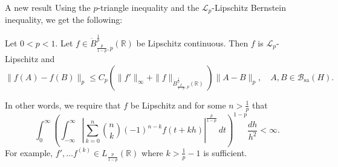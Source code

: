 \documentclass{beamer}
\numberwithin{equation}{section}
\theoremstyle{plain}
\theoremstyle{plain}
\theoremstyle{definition}
\theoremstyle{plain}
\theoremstyle{plain}
\theoremstyle{definition}
\newcommand{\Rl}{\mathbb{R}}
\newcommand{\Itgr}{\mathbb{Z}}
\newcommand{\Bc}{\mathcal{B}}
\newcommand{\Lc}{\mathcal{L}}
\newcommand{\sa}{\mathrm{sa}}
\begin{document}
\begin{frame}{A new result}
    Using the $p$-triangle inequality and the $\Lc_p$-Lipschitz Bernstein inequality, we get the following:
    \begin{theorem}
        Let $0 < p < 1.$ Let $f \in \dot{B}^{\frac1p}_{\frac{p}{1-p},p}(\Rl)$ be Lipschitz continuous. Then $f$ is $\Lc_p$-Lipschitz and
        $$
            \|f(A)-f(B)\|_p \leq C_{p}(\|f'\|_\infty+\|f\|_{\dot{B}^{\frac1p}_{\frac{p}{1-p},p}(\Rl)})\|A-B\|_p,\quad A,B\in \Bc_{\sa}(H).
        $$
    \end{theorem}
    \pause
    In other words, we require that $f$ be Lipschitz and for some $n>\frac1p$ that
    \begin{equation*}
        \int_0^\infty \left(\int_{-\infty}^\infty \left|\sum_{k=0}^n \binom{n}{k}(-1)^{n-k}f(t+kh)\right|^{\frac{p}{1-p}}\,dt\right)^{1-p} \frac{dh}{h^2} < \infty.
    \end{equation*}
    \pause
    For example, $f',\ldots f^{(k)} \in L_{\frac{p}{1-p}}(\Rl)$ where $k > \frac{1}{p}-1$ is sufficient.
\end{frame}
%
\end{document}
